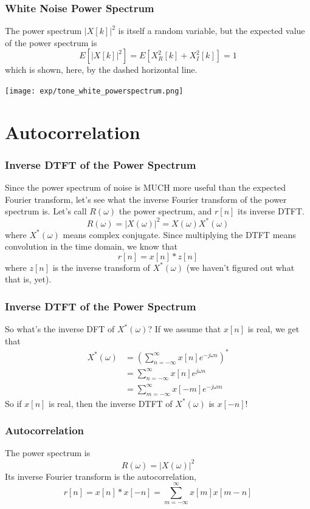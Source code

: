 \documentclass{beamer}
\begin{document}
\begin{frame}
  \frametitle{White Noise Power Spectrum}

  The power spectrum $|X[k]|^2$ is itself a random variable, but the
  expected value of the power spectrum is
  \[
  E\left[|X[k]|^2\right] = E\left[X_R^2[k]+X_I^2[k]\right] = 1
  \]
  which is shown, here, by the dashed horizontal line.
  \centerline{\texttt{[image: exp/tone\_white\_powerspectrum.png]}}
\end{frame}

\section[Autocorrelation]{Autocorrelation}
\setcounter{subsection}{1}

\begin{frame}
  \frametitle{Inverse DTFT of the Power Spectrum}

  Since the power spectrum of noise is MUCH more useful than the
  expected Fourier transform, let's see what the inverse Fourier transform of the power spectrum
  is.  Let's call $R(\omega)$ the power spectrum, and $r[n]$ its inverse
  DTFT.
  \[
  R(\omega) = |X(\omega)|^2 = X(\omega)X^*(\omega)
  \]
  where $X^*(\omega)$ means complex conjugate.  Since multiplying the DTFT
  means convolution in the time domain, we know that
  \[
  r[n] = x[n]\ast z[n]
  \]
  where $z[n]$ is the inverse transform of $X^*(\omega)$ (we haven't
  figured out what that is, yet).
\end{frame}

\begin{frame}
  \frametitle{Inverse DTFT of the Power Spectrum}

  So what's the inverse DFT of $X^*(\omega)$?  If we assume that $x[n]$ is
  real, we get that
  \begin{align*}
    X^*(\omega) &= \left(\sum_{n=-\infty}^{\infty}x[n]e^{-j\omega n}\right)^*\\
    &= \sum_{n=-\infty}^{\infty}x[n]e^{j\omega n}\\
    &= \sum_{m=-\infty}^{\infty}x[-m]e^{-j\omega m}
  \end{align*}
  So if $x[n]$ is real, then the inverse DTFT of $X^*(\omega)$ is $x[-n]$!
\end{frame}
\begin{frame}
  \frametitle{Autocorrelation}
  The power spectrum is
  \[
  R(\omega)=|X(\omega)|^2
  \]
  Its inverse Fourier transform is the autocorrelation,
  \[
  r[n] = x[n]\ast x[-n]  = \sum_{m=-\infty}^\infty  x[m] x[m-n]
  \]
\end{frame}
\end{document}
